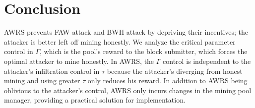 \section{Conclusion}
AWRS prevents FAW attack and BWH attack by depriving their incentives;
the attacker is better left off mining honestly.
We analyze the critical parameter control in $\Gamma$, which is the pool's reward to the block submitter, which forces the optimal attacker to mine honestly. 
In AWRS, the $\Gamma$ control is independent to the attacker's infiltration control in $\tau$ because the attacker's diverging from honest mining and using greater $\tau$ only reduces his reward. 
In addition to AWRS being oblivious to the attacker's control, AWRS only incurs changes in the mining pool manager, providing a practical solution for implementation.


